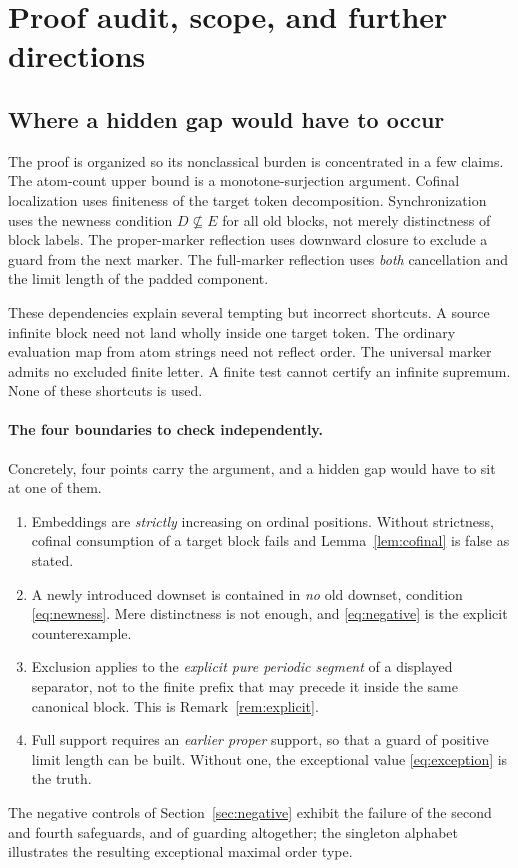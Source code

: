 \documentclass[11pt,a4paper]{article}
\numberwithin{equation}{section}
\theoremstyle{definition}
\theoremstyle{remark}
\begin{document}
\section{Proof audit, scope, and further directions}
\label{sec:audit}

\subsection{Where a hidden gap would have to occur}
The proof is organized so its nonclassical burden is concentrated in a few
claims. The atom-count upper bound is a monotone-surjection argument.
Cofinal localization uses finiteness of the target token decomposition.
Synchronization uses the newness condition $D\nsubseteq E$ for all old
blocks, not merely distinctness of block labels. The proper-marker
reflection uses downward closure to exclude a guard from the next marker.
The full-marker reflection uses \emph{both} cancellation and the limit
length of the padded component.

These dependencies explain several tempting but incorrect shortcuts.
A source infinite block need not land wholly inside one target token.
The ordinary evaluation map from atom strings need not reflect order.
The universal marker admits no excluded finite letter. A finite test
cannot certify an infinite supremum. None of these shortcuts is used.

\paragraph{The four boundaries to check independently.}
Concretely, four points carry the argument, and a hidden gap would have to sit
at one of them.
\begin{enumerate}[label=\textnormal{(\arabic*)}]
\item Embeddings are \emph{strictly} increasing on ordinal positions.
      Without strictness, cofinal consumption of a target block fails and
      Lemma~\ref{lem:cofinal} is false as stated.
\item A newly introduced downset is contained in \emph{no} old downset,
      condition \eqref{eq:newness}. Mere distinctness is not enough, and
      \eqref{eq:negative} is the explicit counterexample.
\item Exclusion applies to the \emph{explicit pure periodic segment} of a
      displayed separator, not to the finite prefix that may precede it inside
      the same canonical block. This is Remark~\ref{rem:explicit}.
\item Full support requires an \emph{earlier proper} support, so that a guard
      of positive limit length can be built. Without one, the exceptional
      value \eqref{eq:exception} is the truth.
\end{enumerate}
The negative controls of Section~\ref{sec:negative} exhibit the failure of the
second and fourth safeguards, and of guarding altogether; the singleton
alphabet illustrates the resulting exceptional maximal order type.
\end{document}
